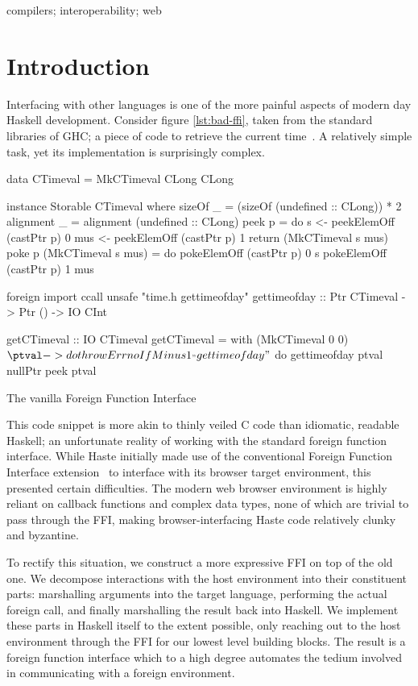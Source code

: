 \documentclass[preprint]{sigplanconf}
\begin{document}
%
\keywords
compilers; interoperability; web

\section{Introduction}\label{sec:intro}
Interfacing with other languages is one of the more painful aspects of modern
day Haskell development. Consider figure \ref{lst:bad-ffi}, taken from the
standard libraries of GHC; a piece of code to retrieve the
current time\ \cite{time}. A relatively simple task, yet its implementation is
surprisingly complex.

\begin{listingfloat}
\begin{code}
data CTimeval = MkCTimeval CLong CLong

instance Storable CTimeval where
	sizeOf _ = (sizeOf (undefined :: CLong)) * 2
	alignment _ = alignment (undefined :: CLong)
	peek p = do
		s   <- peekElemOff (castPtr p) 0
		mus <- peekElemOff (castPtr p) 1
		return (MkCTimeval s mus)
	poke p (MkCTimeval s mus) = do
		pokeElemOff (castPtr p) 0 s
		pokeElemOff (castPtr p) 1 mus

foreign import ccall unsafe "time.h gettimeofday"
   gettimeofday :: Ptr CTimeval -> Ptr () -> IO CInt

getCTimeval :: IO CTimeval
getCTimeval = with (MkCTimeval 0 0) $ \ptval -> do
  throwErrnoIfMinus1_ "gettimeofday" $ do
    gettimeofday ptval nullPtr
  peek ptval
\end{code}
\caption{The vanilla Foreign Function Interface}
\label{lst:bad-ffi}
\end{listingfloat}

This code snippet is more akin to thinly veiled C code than idiomatic, readable
Haskell; an unfortunate reality of working with the standard foreign function
interface.
While Haste initially made use of the conventional Foreign Function Interface
extension\ \cite{ffi} to interface with its browser target environment,
this presented certain difficulties.
The modern web browser environment is highly reliant on callback functions and
complex data types, none of which are trivial to pass through the FFI,
making browser-interfacing Haste code relatively clunky and byzantine.

To rectify this situation, we construct a more expressive FFI on top of the
old one. We decompose interactions with the host environment into their
constituent parts: marshalling arguments into the target language,
performing the actual foreign call,
and finally marshalling the result back into Haskell.
We implement these parts in Haskell itself to the extent possible,
only reaching out to the host environment through the FFI for our lowest level
building blocks. The result is a foreign function interface which to a high
degree automates the tedium involved in communicating with a foreign
environment.
\end{document}
